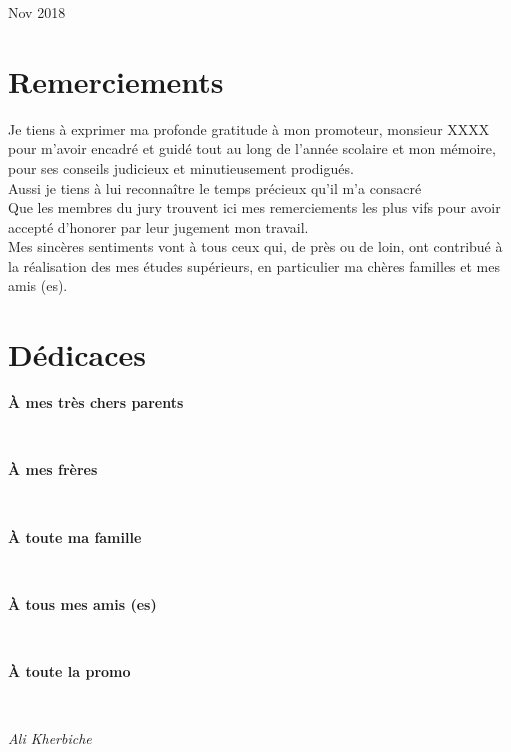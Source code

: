 \documentclass[12pt, a4paper, openany]{report}
\begin{document}
\begin{titlepage}
\begin{sffamily}
\begin{center}
    \vfill

    {\large Nov 2018}

  \end{center}
  \end{sffamily}      
          
  \end{titlepage}
  
\makeatother



\chapter*{Remerciements}

  Je tiens à exprimer ma profonde gratitude à mon promoteur, monsieur XXXX pour m'avoir encadré et guidé tout au long de l'année scolaire et mon mémoire, pour ses conseils judicieux et minutieusement prodigués.\\
  
  Aussi je tiens à lui reconnaître le temps précieux qu’il m'a consacré \\
  
   Que les membres du jury trouvent ici mes remerciements les plus vifs pour avoir accepté d’honorer par leur jugement mon travail.\\
   
   Mes sincères sentiments vont à tous ceux qui, de près ou de loin, ont contribué à la réalisation des mes études supérieurs, en particulier ma chères familles et mes amis (es).\\
   
   
\chapter*{Dédicaces}
 \begin{center}
	\begin{Large} \textbf{À mes très chers parents} \end{Large}\\ 
	\begin{Large} \textbf{À mes frères} \end{Large}\\
	\begin{Large} \textbf{À toute ma famille} \end{Large}\\
	\begin{Large} \textbf{À tous mes amis (es)} \end{Large} \\ 
	\begin{Large} \textbf{À toute la promo} \end{Large}\\
 \end{center}
 \begin{flushright} \begin{Large} \textit{Ali Kherbiche} \end{Large} \end{flushright}
\end{document}
